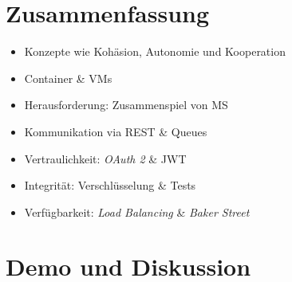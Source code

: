 \documentclass{beamer}
\begin{document}
\section{Zusammenfassung}
\begin{frame}{\insertsection}
	\begin{itemize}
		\item Konzepte wie Kohäsion, Autonomie und Kooperation
		\item Container \& VMs
		\item Herausforderung: Zusammenspiel von MS
		\item Kommunikation via REST \& Queues
		\item Vertraulichkeit: \textit{OAuth 2} \& JWT
		\item Integrität: Verschlüsselung \& Tests
		\item Verfügbarkeit: \textit{Load Balancing} \& \textit{Baker Street}
	\end{itemize}
\end{frame}

\section{Demo und Diskussion}

\section{\bibname}
\begin{frame}[allowframebreaks]{\bibname}
	\AtBeginSection{}
	\nocite{*}
	
	
\end{frame}
\end{document}
